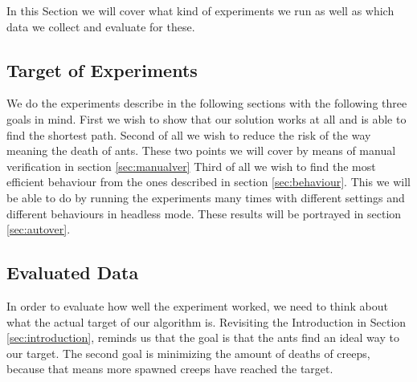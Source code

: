 In this Section we will cover what kind of experiments we run as well as which data we collect and evaluate for these.

\subsection{Target of Experiments}
We do the experiments describe in the following sections with the following three goals in mind.
First we wish to show that our solution works at all and is able to find the shortest path. Second of all we wish to reduce the risk of the way meaning the death of ants. These two points we will cover by means of manual verification in section \ref{sec:manualver}
Third of all we wish to find the most efficient behaviour from the ones described in section \ref{sec:behaviour}. This we will be able to do by running the experiments many times with different settings and different behaviours in headless mode. These results will be portrayed in section \ref{sec:autover}.

\subsection{Evaluated Data}
\label{sec:experimentevdata}

In order to evaluate how well the experiment worked, we need to think about what the actual target of our algorithm is. Revisiting the Introduction in Section \ref{sec:introduction}, reminds us that the goal is that the ants find an ideal way to our target. The second goal is minimizing the amount of deaths of creeps, because that means more spawned creeps have reached the target.



